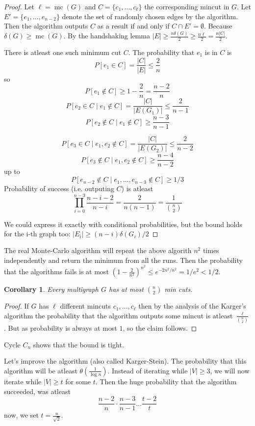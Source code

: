 \documentclass{article}
\theoremstyle{plain}
\newtheorem{dus}{Corollary}
\theoremstyle{definition}
\begin{document}
\begin{proof}
	Let $\ell=\operatorname{mc}(G)$ and $C=\{c_1,\ldots,c_\ell\}$ the corresponding mincut in $G$. Let $E'=\{e_1,\ldots,e_{n-2}\}$ denote the set of randomly chosen edges by the algorithm. Then the algorithm outputs $C$ as a result if and only if $C\cap E'=\emptyset$. Because $\delta(G)\geq \operatorname{mc}(G)$. By the handshaking lemma $|E| \geq \frac{n\delta(G)}{2}\geq \frac{n\ell}{2}=\frac{n|C|}{2}$.
	
	There is atleast one such minimum cut $C$. The probability that $e_1$ is in $C$ is $$P[e_1\in C]=\frac{|C|}{|E|}\leq \frac{2}{n}$$
	so
	$$
	P[e_1\notin C]\geq 1 - \frac{2}{n}=\frac{n-2}{n}
	$$
	$$
	P[e_2\in C \mid e_1\notin C] = \frac{|C|}{|E(G_1)|}\leq \frac{2}{n-1}
	$$
	$$
	P[e_2\notin C \mid e_1\notin C]\geq \frac{n-3}{n-1}
	$$
	
	$$
	P[e_3\in C \mid e_1,e_2\notin C] = \frac{|C|}{|E(G_2)|}\leq \frac{2}{n-2}
	$$
	$$
	P[e_3\notin C \mid e_1,e_2\notin C]\geq \frac{n-4}{n-2}
	$$
	up to
	$$
	P[e_{n-2}\notin C \mid e_1,\ldots, e_{n-3}\notin C] \geq 1/3
	$$
	Probability of success (i.e. outputing $C$) is atleast
	$$
	\prod_{i=0}^{n-3}\frac{n-i-2}{n-i} = \frac{2}{n(n-1)}=\frac{1}{{n\choose 2}}
	$$
	
	We could express it exactly with conditional probabilities, but the bound holds for the i-th graph too: $|E_i|\geq (n-i)\delta(G_i)/2$
\end{proof}


The real Monte-Carlo algorithm will repeat the above algorith $n^2$ times independently and return the minimum from all the runs. Then the probability that the algorithms fails is at most $(1-\frac{2}{n^2})^{n^2}\leq e ^{-2n^2/n^2}=1/e^2<1/2$.

\begin{dus}
	Every multigraph $G$ has at most $n\choose 2$ min cuts.
\end{dus}
\begin{proof}
	If $G$ has $\ell$ different mincuts $c_1,\ldots, c_\ell$ then by the analysis of the Karger's algorithm the probability that the algorithm outputs some mincut is atleast
	$\frac{\ell}{{n\choose 2}}$. But as probability is always at most $1$, so the claim follows.
\end{proof}

Cycle $C_n$ shows that the bound is tight.

Let's improve the algorithm (also called Karger-Stein). The probability that this algorithm will be atleast $\theta(\frac{1}{\log n})$. Instead of iterating while $|V|\geq 3$, we will now iterate while $|V|\geq t$ for some $t$. Then the huge probability that the algorithm succeeded, was atleast
$$
\frac{n-2}{n}\cdot \frac{n-3}{n-1}\ldots \frac{t-2}{t}
$$
now, we set $t=\frac{n}{\sqrt{2}}$.
\end{document}
